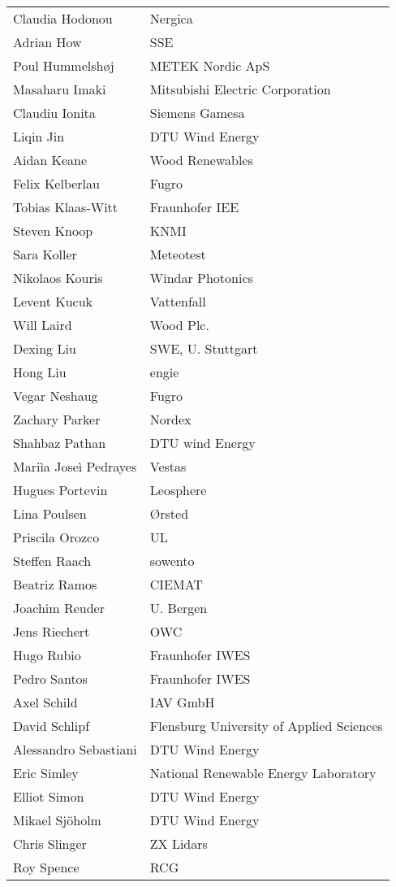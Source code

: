 \begin{supertabular}{@{}|p{\tabcolsep}|p{\tabcolsep}|@{}}
Claudia Hodonou & Nergica \\
Adrian How & SSE \\
Poul Hummelshøj & METEK Nordic ApS \\
Masaharu Imaki & Mitsubishi Electric Corporation \\
Claudiu Ionita & Siemens Gamesa \\
Liqin Jin & DTU Wind Energy\\
Aidan Keane & Wood Renewables \\
Felix Kelberlau & Fugro \\
Tobias Klaas-Witt & Fraunhofer IEE\\
Steven Knoop & KNMI \\
Sara Koller & Meteotest \\
Nikolaos Kouris & Windar Photonics \\
Levent Kucuk & Vattenfall \\
Will Laird & Wood Plc.\\
Dexing Liu & SWE, U. Stuttgart \\
Hong Liu & engie \\
Vegar Neshaug & Fugro \\
Zachary Parker & Nordex \\
Shahbaz Pathan & DTU wind Energy \\
Mariìa Joseì Pedrayes & Vestas \\
Hugues Portevin & Leosphere \\
Lina Poulsen & \O rsted\\
Priscila Orozco & UL \\
Steffen Raach & sowento\\
Beatriz Ramos & CIEMAT \\
Joachim Reuder & U. Bergen \\
Jens Riechert & OWC \\
Hugo Rubio & Fraunhofer IWES \\
Pedro Santos & Fraunhofer IWES \\
Axel Schild & IAV GmbH\\
David Schlipf & Flensburg University of Applied Sciences \\
Alessandro Sebastiani & DTU Wind Energy \\
Eric Simley & National Renewable Energy Laboratory \\
Elliot Simon & DTU Wind Energy \\
Mikael Sj\"oholm & DTU Wind Energy \\
Chris Slinger & ZX Lidars \\
Roy Spence & RCG \\

\end{supertabular}
